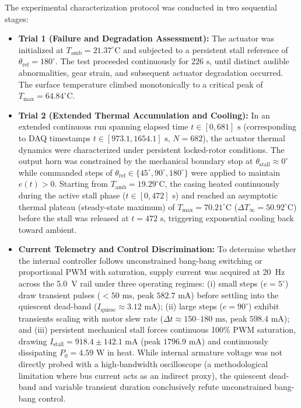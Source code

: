 \documentclass[lettersize,journal]{IEEEtran}
\begin{document}
	The experimental characterization protocol was conducted in two sequential stages:
	\begin{itemize}
		\item \textbf{Trial 1 (Failure and Degradation Assessment):} The actuator was initialized at $T_{\text{amb}} = 21.37^\circ\text{C}$ and subjected to a persistent stall reference of $\theta_{\text{ref}} = 180^\circ$. The test proceeded continuously for $226\text{ s}$, until distinct audible abnormalities, gear strain, and subsequent actuator degradation occurred. The surface temperature climbed monotonically to a critical peak of $T_{\max} = 64.84^\circ\text{C}$.
		\item \textbf{Trial 2 (Extended Thermal Accumulation and Cooling):} In an extended continuous run spanning elapsed time $t \in [0, 681]\text{ s}$ (corresponding to DAQ timestamps $t \in [973.1, 1654.1]\text{ s}$, $N = 682$), the actuator thermal dynamics were characterized under persistent locked-rotor conditions. The output horn was constrained by the mechanical boundary stop at $\theta_{\text{stall}} \approx 0^\circ$ while commanded steps of $\theta_{\text{ref}} \in \{45^\circ, 90^\circ, 180^\circ\}$ were applied to maintain $e(t) > 0$. Starting from $T_{\text{amb}} = 19.29^\circ\text{C}$, the casing heated continuously during the active stall phase ($t \in [0, 472]\text{ s}$) and reached an asymptotic thermal plateau (steady-state maximum) of $T_{\max} = 70.21^\circ\text{C}$ ($\Delta T_\infty = 50.92^\circ\text{C}$) before the stall was released at $t = 472\text{ s}$, triggering exponential cooling back toward ambient.
		\item \textbf{Current Telemetry and Control Discrimination:} To determine whether the internal controller follows unconstrained bang-bang switching or proportional PWM with saturation, supply current was acquired at 20~Hz across the 5.0~V rail under three operating regimes: (i) small steps ($e = 5^\circ$) draw transient pulses ($< 50\text{ ms}$, peak $582.7\text{ mA}$) before settling into the quiescent dead-band ($I_{\text{quiesc}} \approx 3.12\text{ mA}$); (ii) large steps ($e = 90^\circ$) exhibit transients scaling with motor slew rate ($\Delta t \approx 150\text{--}180\text{ ms}$, peak $598.4\text{ mA}$); and (iii) persistent mechanical stall forces continuous 100\% PWM saturation, drawing $I_{\text{stall}} = 918.4 \pm 142.1\text{ mA}$ (peak $1796.9\text{ mA}$) and continuously dissipating $P_0 = 4.59\text{ W}$ in heat. While internal armature voltage was not directly probed with a high-bandwidth oscilloscope (a methodological limitation where bus current acts as an indirect proxy), the quiescent dead-band and variable transient duration conclusively refute unconstrained bang-bang control.
	\end{itemize}
	
\end{document}
